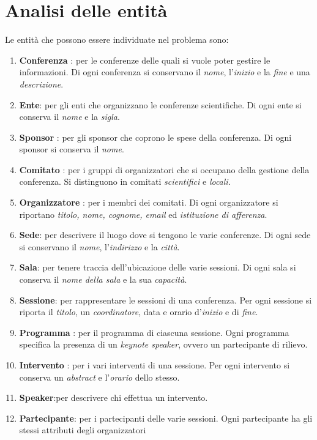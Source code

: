 \section{Analisi delle entità}
Le entità che possono essere individuate nel problema sono:
\begin{enumerate}
\item \textbf{Conferenza} : per le conferenze delle quali si vuole poter gestire le informazioni. Di ogni conferenza si conservano il \textit{nome}, l'\textit{inizio} e la \textit{fine} e una \textit{descrizione}.
\item \textbf{Ente}: per gli enti che organizzano le conferenze scientifiche. Di ogni ente si conserva il \textit{nome} e la \textit{sigla}. 
\item \textbf{Sponsor} : per gli sponsor che coprono le spese della conferenza. Di ogni sponsor si conserva il \textit{nome}.
\item \textbf{Comitato} : per i gruppi di organizzatori che si occupano della gestione della conferenza. Si distinguono in comitati \textit{scientifici} e \textit{locali}. 
\item \textbf{Organizzatore} : per i membri dei comitati. Di ogni organizzatore si riportano \textit{titolo, nome, cognome, email} ed \textit{istituzione di afferenza}.
\item \textbf{Sede}: per descrivere il luogo dove si tengono le varie conferenze. Di ogni sede si conservano il \textit{nome}, l'\textit{indirizzo} e la \textit{città}.
\item \textbf{Sala}: per tenere traccia dell'ubicazione delle varie sessioni. Di ogni sala si conserva il \textit{nome della sala} e la sua \textit{capacità}.
\item \textbf{Sessione}: per rappresentare le sessioni di una conferenza. Per ogni sessione si riporta il \textit{titolo}, un \textit{coordinatore}, data e orario d'\textit{inizio} e di \textit{fine}.
\item \textbf{Programma} : per il programma di ciascuna sessione. Ogni programma specifica la presenza di un \textit{keynote speaker}, ovvero un partecipante di rilievo.
\item \textbf{Intervento} : per i vari interventi di una sessione. Per ogni intervento si conserva un \textit{abstract} e l'\textit{orario} dello stesso.
\item \textbf{Speaker}:per descrivere chi effettua un intervento. 
\item \textbf{Partecipante}: per i partecipanti delle varie sessioni. Ogni partecipante ha gli stessi attributi degli organizzatori

\end{enumerate}
